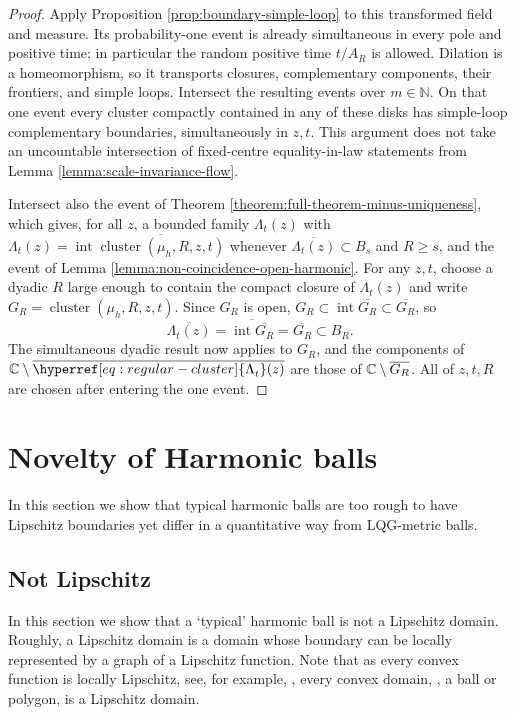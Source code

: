 \documentclass[12pt]{amsart}
\numberwithin{equation}{section}
\newcommand{\regcluster}[2]{\hyperref[eq:regular-cluster]{\Lambda^{#1}_{#2}}}
\begin{document}
\begin{proof}
		Apply Proposition \ref{prop:boundary-simple-loop} to this transformed field and measure. Its probability-one event is
		already simultaneous in every pole and positive time; in particular the random positive time $t/A_R$ is allowed.
		Dilation is a homeomorphism, so it transports closures, complementary components, their frontiers, and simple loops.
		Intersect the resulting events over $m\in\mathbb N$. On that one event every cluster compactly contained in any of these
		disks has simple-loop complementary boundaries, simultaneously in $z,t$. This argument does not take an uncountable
		intersection of fixed-centre equality-in-law statements from Lemma \ref{lemma:scale-invariance-flow}.

		Intersect also the event of Theorem \ref{theorem:full-theorem-minus-uniqueness}, which gives, for all $z$, a bounded
		family ${\regcluster{}{t}}(z)$ with
		${\regcluster{}{t}}(z)=\operatorname{int}\overline{\operatorname{cluster}(\mu_h,R,z,t)}$ whenever
		$\overline{{\regcluster{}{t}}(z)}\subset B_s$ and $R\geq s$, and the event of Lemma \ref{lemma:non-coincidence-open-harmonic}.
		For any $z,t$, choose a dyadic $R$ large enough to contain the compact closure of ${\regcluster{}{t}}(z)$ and write
		$G_R=\operatorname{cluster}(\mu_h,R,z,t)$. Since $G_R$ is open, $G_R\subset\operatorname{int}\overline{G_R}\subset\overline{G_R}$, so
		\[
		 \overline{{\regcluster{}{t}}(z)}=\overline{\operatorname{int}\overline{G_R}}=\overline{G_R}\subset B_R .
		\]
		The simultaneous dyadic result now applies to $G_R$, and the components of $\C\setminus\overline{{\regcluster{}{t}}(z)}$ are
		those of $\mathbb{C}\setminus\overline{G_R}$. All of $z,t,R$ are chosen after entering the one event.
	\end{proof}
	
	
	
	
	
	\section{Novelty of Harmonic balls} \label{sec:novelty}
	
	
	In this section we show that typical harmonic balls are too rough to have Lipschitz boundaries 
	yet differ in a quantitative way from LQG-metric balls. 
	
	
	
	\subsection{Not Lipschitz} \label{subsec:not-lipschitz}
	In this section we show that a `typical' harmonic ball is not a Lipschitz domain.
	Roughly, a Lipschitz domain is a domain whose boundary can be locally represented
	by a graph of a Lipschitz function. Note that as every convex function is locally Lipschitz, see, for example, 
	\cite[Lemma 1.1.6]{gutierrez}, every convex domain, \eg,  a ball or polygon, is a Lipschitz domain.
	
\end{document}
